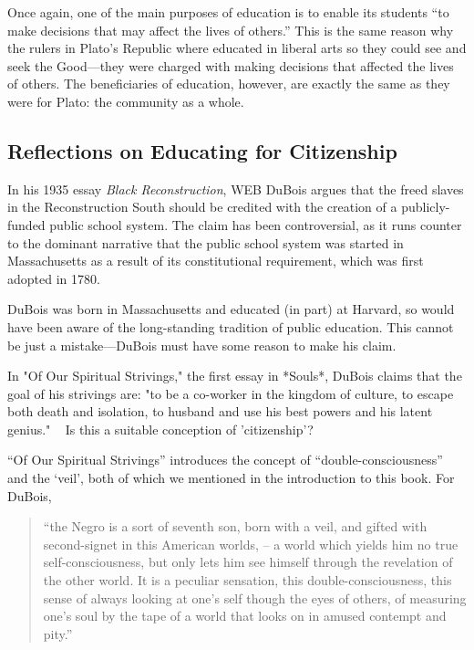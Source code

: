 Once again, one of the main purposes of education is to enable its students ``to make decisions that may affect the lives of others.'' This is the same reason why the rulers in Plato's Republic where educated in liberal arts so they could see and seek the Good---they were charged with making decisions that affected the lives of others. The beneficiaries of education, however, are exactly the same as they were for Plato: the community as a whole. 

\subsection{Reflections on Educating for Citizenship}
\label{reflectionsoneducatingforcitizenship}

In his 1935 essay \emph{Black Reconstruction}, WEB DuBois argues that the freed slaves in the Reconstruction South should be credited with the creation of a publicly-funded public school system. The claim has been controversial, as it runs counter to the dominant narrative that the public school system was started in Massachusetts as a result of its constitutional requirement, which was first adopted in 1780.

DuBois was born in Massachusetts and educated (in part) at Harvard, so would have been aware of the long-standing tradition of public education. This cannot be just a mistake---DuBois must have some reason to make his claim.\begin{question}In "Of Our Spiritual Strivings," the first essay in *Souls*, DuBois claims that the goal of his strivings are: "to be a co-worker in the kingdom of culture, to escape both death and isolation, to husband and use his best powers and his latent genius." ~\citep[p. 3]{DuBois:1994ui} Is this a suitable conception of 'citizenship'?  \end{question}

``Of Our Spiritual Strivings'' introduces the concept of ``double-consciousness'' and the `veil', both of which we mentioned in the introduction to this book. For DuBois, 

\begin{quote}

``the Negro is a sort of seventh son, born with a veil, and gifted with second-signet in this American worlds, -- a world which yields him no true self-consciousness, but only lets him see himself through the revelation of the other world. It is a peculiar sensation, this double-consciousness, this sense of always looking at one's self though the eyes of others, of measuring one's soul by the tape of a world that looks on in amused contempt and pity.'' ~\citep[p.2]{DuBois:1994ui}
\end{quote}

